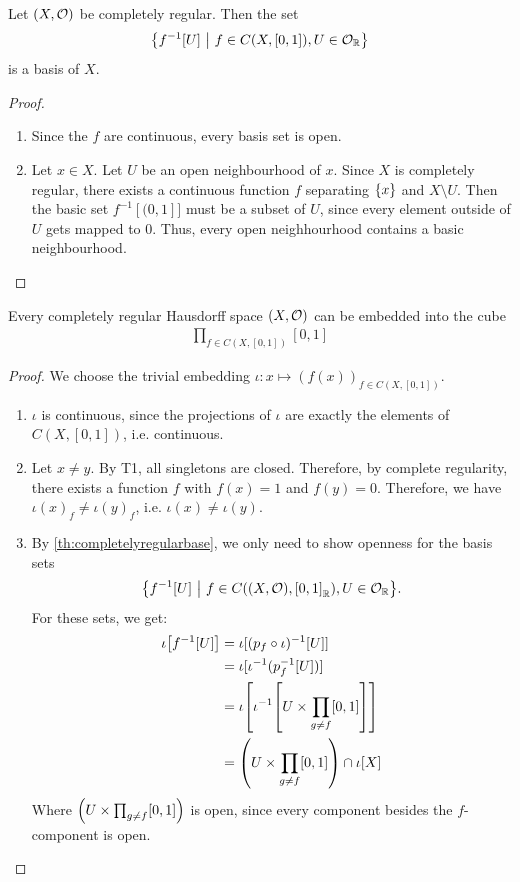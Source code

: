 \begin{theorem}
	\label{th:completelyregularbase}
	Let $(X, \mathcal{O})$ be completely regular. Then the set
	\begin{align*}
		\qty{f^{-1}[U] ~\middle|~f \in C(X, \qty[0,1]), U \in \mathcal{O}_{\mathbb{R}}}
	\end{align*}
	is a basis of $X$.
\end{theorem}
\begin{proof}
	\begin{enumerate}
		\item Since the $f$ are continuous, every basis set is open.
		\item Let $x \in X$. Let $U$ be an open neighbourhood of $x$.
		Since $X$ is completely regular, there exists a continuous function $f$ separating $\qty{x}$ and $X \setminus U$. Then the basic set $f^{-1}[(0,1]]$ must be a subset of $U$, since every element outside of $U$ gets mapped to $0$. Thus, every open neighhourhood contains a basic neighbourhood.
	\end{enumerate}	
\end{proof}
\begin{theorem}
	Every completely regular Hausdorff space $(X, \mathcal{O})$ can be embedded into the cube
	\begin{align*}
		\prod_{f \in C(X, [0,1])} [0,1]
	\end{align*}
\end{theorem}
\begin{proof}
	We choose the trivial embedding $\iota : x \mapsto (f(x))_{f \in C(X,[0,1])}$. 
	\begin{enumerate}
		\item $\iota$ is continuous, since the projections of $\iota$ are exactly the elements of $C(X,[0,1])$, i.e. continuous.
		\item Let $x \neq y$. By T1, all singletons are closed. Therefore, by complete regularity, there exists a function $f$ with $f(x) = 1$ and $f(y) = 0$. Therefore, we have $\iota(x)_f \neq \iota(y)_f$, i.e. $\iota(x) \neq \iota(y)$.
		\item By \ref{th:completelyregularbase}, we only need to show openness for the basis sets
		\begin{align*}
			\qty{f^{-1}[U] ~\middle|~f \in C((X, \mathcal{O}), \qty[0,1]_{\mathbb{R}}), U \in \mathcal{O}_{\mathbb{R}}}.
		\end{align*}
		For these sets, we get:
		\begin{align*}
			\iota\qty[f^{-1}[U]]
			&= \iota[(p_f \circ \iota)^{-1}[U]]\\
			&= \iota[\iota^{-1} (p_f^{-1}[U])]\\
			&= \iota\qty[\iota^{-1}\qty[U \times \prod_{g \neq f} [0,1]]]\\
			&= \qty(U \times \prod_{g \neq f} [0,1]) \cap \iota[X]
		\end{align*}
		Where $\qty(U \times \prod_{g \neq f} [0,1])$ is open, since every component besides the $f$-component is open.
	\end{enumerate}
\end{proof}

